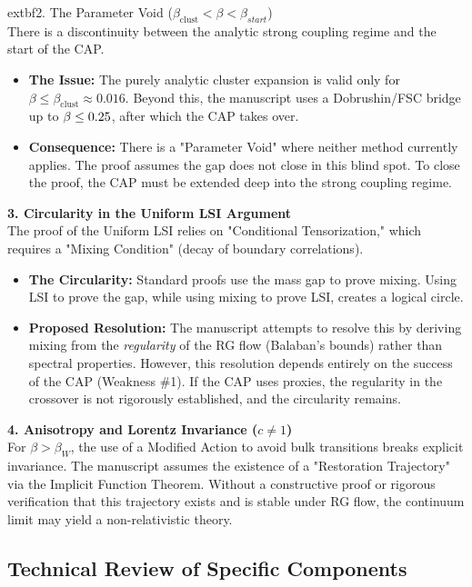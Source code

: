	extbf{2. The Parameter Void ($\beta_{\mathrm{clust}} < \beta < \beta_{start}$)} \\
There is a discontinuity between the analytic strong coupling regime and the start of the CAP.
\begin{itemize}
    \item \textbf{The Issue:} The purely analytic cluster expansion is valid only for $\beta \le \beta_{\mathrm{clust}}\approx 0.016$. Beyond this, the manuscript uses a Dobrushin/FSC bridge up to $\beta \le 0.25$, after which the CAP takes over.
    \item \textbf{Consequence:} There is a "Parameter Void" where neither method currently applies. The proof assumes the gap does not close in this blind spot. To close the proof, the CAP must be extended deep into the strong coupling regime.
\end{itemize}

\textbf{3. Circularity in the Uniform LSI Argument} \\
The proof of the Uniform LSI relies on "Conditional Tensorization," which requires a "Mixing Condition" (decay of boundary correlations).
\begin{itemize}
    \item \textbf{The Circularity:} Standard proofs use the mass gap to prove mixing. Using LSI to prove the gap, while using mixing to prove LSI, creates a logical circle.
    \item \textbf{Proposed Resolution:} The manuscript attempts to resolve this by deriving mixing from the \textit{regularity} of the RG flow (Balaban's bounds) rather than spectral properties. However, this resolution depends entirely on the success of the CAP (Weakness \#1). If the CAP uses proxies, the regularity in the crossover is not rigorously established, and the circularity remains.
\end{itemize}

\textbf{4. Anisotropy and Lorentz Invariance ($c \neq 1$)} \\
For $\beta > \beta_W$, the use of a Modified Action to avoid bulk transitions breaks explicit  invariance. The manuscript assumes the existence of a "Restoration Trajectory"  via the Implicit Function Theorem. Without a constructive proof or rigorous verification that this trajectory exists and is stable under RG flow, the continuum limit may yield a non-relativistic theory.

\subsection*{Technical Review of Specific Components}

